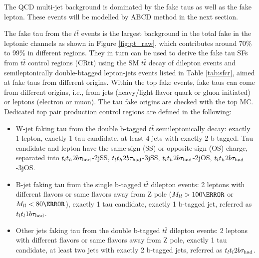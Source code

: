The QCD multi-jet background is dominated by the fake taus as well as the fake lepton. These events will be modelled by ABCD method in the next section.

The fake tau from the $t\bar t$ events is the largest background in the total fake in the leptonic channels as shown in Figure \ref{fig:pt_raw}, which contributes around 70\% to 99\% in different regions. They in turn can be used to derive the fake tau SFs from $t\bar{t}$ control regions (CRtt) using the SM $t\bar t$ decay of dilepton events and semileptonically double-btagged lepton-jets events listed in Table \ref{tab:sfcr},
aimed at fake taus from different origins.
Within the top fake events, fake taus can come from different origins, i.e., from jets (heavy/light flavor quark or gluon initiated) or leptons (electron or muon). The tau fake origins are checked with the top MC. Dedicated top pair production control regions are defined in the following:
\begin{itemize}
\item{W-jet faking tau from the double b-tagged $t\bar t$ semileptonically decay: exactly 1 lepton, exactly 1 tau candidate, at least 4 jets with exactly 2 b-tagged. Tau candidate and lepton have the same-sign (SS) or
  opposite-sign (OS) charge, separated into $t_lt_h2b\tau_\text{had}$-2jSS, $t_lt_h2b\tau_\text{had}$-3jSS, $t_lt_h2b\tau_\text{had}$-2jOS, $t_lt_h2b\tau_\text{had}$-3jOS.}
\item{B-jet faking tau from the single b-tagged $t\bar t$ dilepton events: 2 leptons with different flavors or same flavors away from Z pole ($M_{ll}>100\GeV$ or $M_{ll}<80\GeV$), exactly 1 tau candidate, exactly 1 b-tagged jet, referred as $t_lt_l1b\tau_\text{had}$.}
\item{Other jets faking tau from the double b-tagged $t\bar t$ dilepton events: 2 leptons with different flavors or same flavors away from Z pole, exactly 1 tau candidate, at least two jets with exactly 2 b-tagged jets, referred as $t_lt_l2b\tau_\text{had}$.}
\end{itemize}



